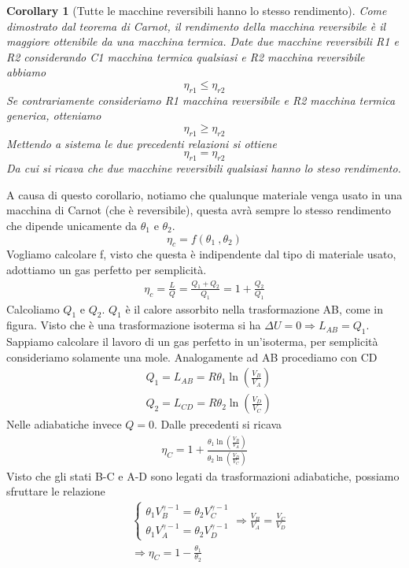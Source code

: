 \documentclass[10pt,a4paper]{article}
\newtheorem{corollary}{Corollary}[theorem]
\begin{document}
\begin{corollary}[Tutte le macchine reversibili hanno lo stesso rendimento]
Come dimostrato dal teorema di Carnot, il rendimento della macchina reversibile è il maggiore ottenibile da una macchina termica. Date due macchine reversibili R1 e R2 considerando C1 macchina termica qualsiasi e R2 macchina reversibile abbiamo \[\eta_{r1}\leq \eta_{r2}\] Se contrariamente consideriamo R1 macchina reversibile e R2 macchina termica generica, otteniamo \[\eta_{r1}\geq \eta_{r2}\] Mettendo a sistema le due precedenti relazioni si ottiene \[\eta_{r1} = \eta_{r2}\] Da cui si ricava che due macchine reversibili qualsiasi hanno lo steso rendimento. 
\end{corollary}

A causa di questo corollario, notiamo che qualunque materiale venga usato in una macchina di Carnot (che è reversibile), questa avrà sempre lo stesso rendimento che dipende unicamente da $\theta_1$ e $\theta_2$. 
\[\eta_ c= f(\theta_1\ ,\theta_2 )\]
Vogliamo calcolare f, visto che questa è indipendente dal tipo di materiale usato, adottiamo un gas perfetto per semplicità. 
\begin{align*}
	\eta_c = \frac{L}{Q}=\frac{Q_1 + Q_2}{Q_1}= 1 + \frac{Q_2}{Q_1}
\end{align*} 
Calcoliamo \(Q_1\) e \(Q_2\). \(Q_1\) è il calore assorbito nella trasformazione AB, come in figura. Visto che è una trasformazione isoterma si ha \(\Delta U = 0 \Rightarrow L_{AB}  = Q_1\). Sappiamo calcolare il lavoro di un gas perfetto in un'isoterma, per semplicità consideriamo solamente una mole. Analogamente ad AB procediamo con CD
\begin{align*}
	&Q_1 = L_{AB} = R\theta_1\ln(\frac{V_B}{V_A})\\
	&Q_2 = L_{CD} = R\theta_2\ln(\frac{V_D}{V_C})
\end{align*}
Nelle adiabatiche invece $Q=0$. Dalle precedenti si ricava
\begin{align*}
	\eta_C = 1+\frac{\theta_1\ln(\frac{V_B}{V_A})}{\theta_2\ln(\frac{V_D}{V_C})}
\end{align*}
Visto che gli stati B-C e A-D sono legati da trasformazioni adiabatiche, possiamo sfruttare le relazione 
\begin{align}
	&\begin{cases}
		\theta_1 V_B^{\gamma -1} = \theta_2 V_C^{\gamma -1}\\
		\theta_1 V_A^{\gamma -1} = \theta_2 V_D^{\gamma -1}
	\end{cases}
	\Rightarrow \frac{V_B}{V_A} = \frac{V_C}{V_D}\nonumber\\
	&\Rightarrow \eta_C = 1-\frac{\theta_1}{\theta_2}\label{eq:rendimento_carnot}
\end{align}
\end{document}

